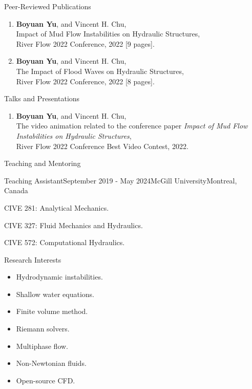 \documentclass{resume} %
\begin{document}
\begin{rSection}{Peer-Reviewed Publications}
\begin{enumerate}
	\item \textbf{Boyuan Yu}, and Vincent H. Chu,\\
	Impact of Mud Flow Instabilities on Hydraulic Structures,\\
	River Flow 2022 Conference, 2022 [9 pages].
	
	\item \textbf{Boyuan Yu}, and Vincent H. Chu,\\
	The Impact of Flood Waves on Hydraulic Structures,\\
	River Flow 2022 Conference, 2022 [8 pages].

\end{enumerate}

\end{rSection}

\begin{rSection}{Talks and Presentations}
\begin{enumerate}
	\item \textbf{Boyuan Yu}, and Vincent H. Chu,\\
	The video animation related to the conference paper \textit{Impact of Mud Flow Instabilities on Hydraulic Structures},\\
	River Flow 2022 Conference Best Video Contest, 2022.
\end{enumerate}
	
\end{rSection}	


\begin{rSection}{Teaching and Mentoring}

    \begin{rSubsection}{Teaching Assistant}{September 2019 - May 2024}{McGill University}{Montreal, Canada}
        \item CIVE 281: Analytical Mechanics.
        \item CIVE 327: Fluid Mechanics and Hydraulics.
        \item CIVE 572: Computational Hydraulics.
    \end{rSubsection}

\end{rSection}

\begin{rSection}{Research Interests}
	\begin{itemize}
		\item Hydrodynamic instabilities.
		\item Shallow water equations.
		\item Finite volume method.
		\item Riemann solvers.
		\item Multiphase flow.
		\item Non-Newtonian fluids.
		\item Open-source CFD.
	\end{itemize}
	
\end{rSection}
\end{document}
